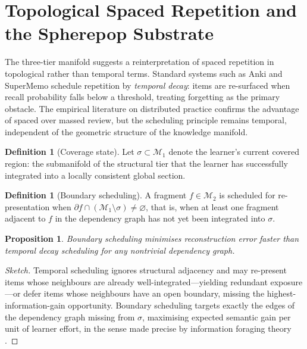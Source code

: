 \documentclass{amsart}
\theoremstyle{plain}
\newtheorem{proposition}[theorem]{Proposition}
\theoremstyle{definition}
\newtheorem{definition}[theorem]{Definition}
\theoremstyle{remark}
\newcommand{\Man}{\mathcal{M}}
\begin{document}
\section{Topological Spaced Repetition and the Spherepop Substrate}
\label{sec:topo-srs}

The three-tier manifold suggests a reinterpretation of spaced repetition in
topological rather than temporal terms.  Standard systems such as Anki and SuperMemo
\cite{wozniak1990} schedule repetition by \emph{temporal decay}: items are
re-surfaced when recall probability falls below a threshold, treating forgetting as
the primary obstacle.  The empirical literature on distributed practice
\cite{cepeda2006} confirms the advantage of spaced over massed review, but the
scheduling principle remains temporal, independent of the geometric structure of
the knowledge manifold.

\begin{definition}[Coverage state]
  \label{def:coverage}
  Let $\sigma \subset \Man_1$ denote the learner's current covered region: the
  submanifold of the structural tier that the learner has successfully integrated
  into a locally consistent global section.
\end{definition}

\begin{definition}[Boundary scheduling]
  \label{def:boundary-sched}
  A fragment $f \in \Man_2$ is scheduled for re-presentation when
  $\partial f \cap (\Man_1 \setminus \sigma) \neq \varnothing$, that is, when at
  least one fragment adjacent to $f$ in the dependency graph has not yet been
  integrated into $\sigma$.
\end{definition}

\begin{proposition}
  \label{prop:topo-srs}
  Boundary scheduling minimises reconstruction error faster than temporal decay
  scheduling for any nontrivial dependency graph.
\end{proposition}

\begin{proof}[Sketch]
  Temporal scheduling ignores structural adjacency and may re-present items whose
  neighbours are already well-integrated---yielding redundant exposure---or defer
  items whose neighbours have an open boundary, missing the highest-information-gain
  opportunity.  Boundary scheduling targets exactly the edges of the dependency
  graph missing from $\sigma$, maximising expected semantic gain per unit of learner
  effort, in the sense made precise by information foraging theory \cite{pirolli1999}.
\end{proof}
\end{document}
